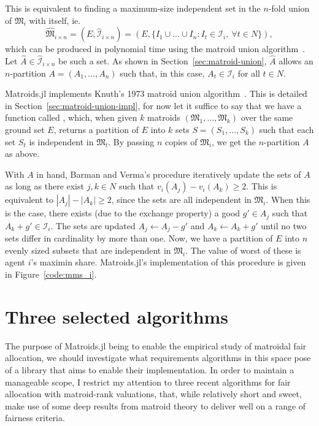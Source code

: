 This is equivalent to finding a maximum-size independent set in the $n$-fold union of $\mathfrak{M}_i$ with itself, ie.
$$\widehat{\mathfrak{M}}_{i \times n} = (E, \widehat{\mathcal{I}}_{i\times n}) = (E, \{ I_1\cup\dots\cup I_n : I_t \in \mathcal{I}_i,\ \forall t \in N \}),$$ 
which can be produced in polynomial time using the matroid union algorithm~\cite[Ch. 42]{schrijver-2003}. Let $\widehat{A}\in\widehat{\mathcal{I}}_{i\times n}$ be such a set. As shown in Section~\ref{sec:matroid-union}, $\widehat{A}$ allows an $n$-partition $A = (A_1,\dots,A_n)$ such that, in this case, $A_t\in\mathcal{I}_i$ for all $t\in N$.



Matroids.jl implements Knuth's 1973 matroid union algorithm~\cite{knuth1973matroidpartitioning}. This is detailed in Section~\ref{sec:matroid-union-impl}, for now let it suffice to say that we have a function called , which, when given $k$ matroids $(\mathfrak{M}_1,\dots,\mathfrak{M}_k)$ over the same ground set $E$, returns a partition of $E$ into $k$ sets $S = (S_1, \dots, S_k)$ such that each set $S_t$ is independent in $\mathfrak{M}_t$. By passing $n$ copies of $\mathfrak{M}_i$, we get the $n$-partition $A$ as above.

With $A$ in hand, Barman and Verma's procedure iteratively update the sets of $A$ as long as there exist $j, k \in N$ such that $v_i(A_j) - v_i(A_k) \geq 2$. This is equivalent to $|A_j| - |A_k| \geq 2$, since the sets are all independent in $\mathfrak{M}_i$. When this is the case, there exists (due to the exchange property) a good $g'\in A_j$ such that $A_k + g' \in \mathcal{I}_i$. The sets are updated $A_j \leftarrow A_j - g'$ and $A_k \leftarrow A_k + g'$ until no two sets differ in cardinality by more than one. Now, we have a partition of $E$ into $n$ evenly sized subsets that are independent in $\mathfrak{M}_i$. The value of worst of these is agent $i$'s maximin share. Matroids.jl's implementation of this procedure is given in Figure~\ref{code:mms_i}.




\section{Three selected algorithms}
\label{sec:three-algos}
The purpose of Matroids.jl being to enable the empirical study of matroidal fair allocation, we should investigate what requirements algorithms in this space pose of a library that aims to enable their implementation. In order to maintain a manageable scope, I restrict my attention to three recent algorithms for fair allocation with matroid-rank valuations, that, while relatively short and sweet, make use of some deep results from matroid theory to deliver well on a range of fairness criteria.


